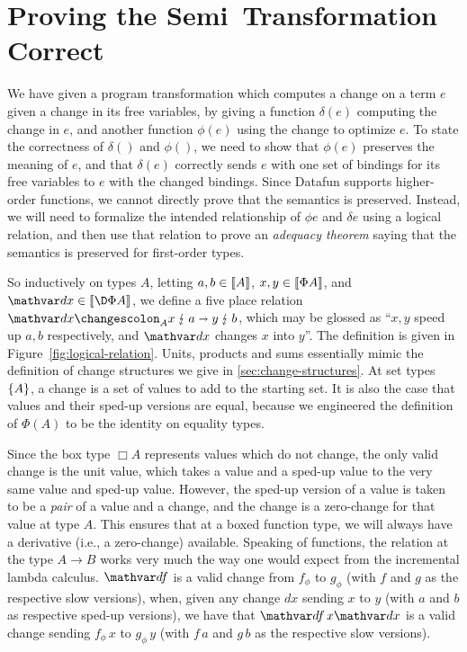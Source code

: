 \section{Proving the Semi\naive\ Transformation Correct}

We have given a program transformation which computes a change on a
term $e$ given a change in its free variables, by giving a function
$\delta(e)$ computing the change in $e$, and another function 
$\phi(e)$ using the change to optimize $e$. To state the correctness
of $\delta()$ and $\phi()$, we need to show that $\phi(e)$ preserves
the meaning of $e$, and that
$\delta(e)$ correctly sends $e$ with one set of bindings for its free
variables to $e$ with the changed bindings.
%
Since Datafun supports higher-order functions, we cannot directly
prove that the semantics is preserved. Instead, we will need to
formalize the intended relationship of $\phi e$ and $\delta e$ using a
logical relation, and then use that relation to prove an
\emph{adequacy theorem} saying that the semantics is preserved for
first-order types.

So inductively on types $A$, letting $a,b \in \llbracket{A}\rrbracket$,
$x,y \in \llbracket{\Phi A}\rrbracket$, and $\dx \in \den{\DP A}$, we define a five
place relation $\weirdat{A}{\dx}{x}{a}{y}{b}$, which may be glossed as
``$x,y$ speed up $a,b$ respectively, and $\dx$ changes $x$ into $y$''.
The definition is given in Figure~\ref{fig:logical-relation}. Units,
products and sums essentially mimic the definition of change
structures we give in \cref{sec:change-structures}. At set types
$\{{A}\}$, a change is a set of values to add to the
starting set. It is also the case that values and their
sped-up versions are equal, because we engineered the definition of
$\Phi(A)$ to be the identity on equality types.

Since the box type $\Box A$ represents values which do not change, the
only valid change is the unit value, which takes a value and a sped-up
value to the very same value and sped-up value. However, the sped-up
version of a value is taken to be a \emph{pair} of a value and a
change, and the change is a zero-change for that value at type $A$.
This ensures that at a boxed function type, we will always have a
derivative (i.e., a zero-change) available. 
%
Speaking of functions, the relation at the type $A \to B$ works very
much the way one would expect from the incremental lambda calculus.
$\df$ is a valid change from $f_\phi$ to $g_\phi$ (with $f$ and $g$ as the
respective slow versions), when, given any
change $dx$ sending $x$ to $y$ (with $a$ and $b$ as respective sped-up
versions), we have that $\df\,x\dx$ is a valid change sending
$f_\phi\,x$ to $g_\phi\,y$ (with $f\,a$ and $g\,b$ as the respective
slow versions). 

